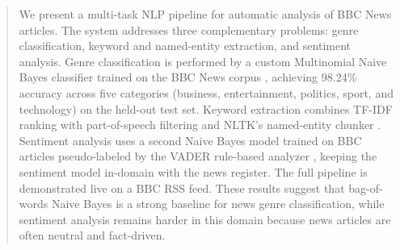 \begin{abstract}
We present a multi-task NLP pipeline for automatic analysis of BBC News articles. The system addresses three complementary problems: genre classification, keyword and named-entity extraction, and sentiment analysis. Genre classification is performed by a custom Multinomial Naive Bayes classifier trained on the BBC News corpus \cite{greene2006practical}, achieving 98.24\% accuracy across five categories (business, entertainment, politics, sport, and technology) on the held-out test set. Keyword extraction combines TF-IDF ranking with part-of-speech filtering and NLTK's named-entity chunker \cite{bird2009natural}. Sentiment analysis uses a second Naive Bayes model trained on BBC articles pseudo-labeled by the VADER rule-based analyzer \cite{hutto2014vader}, keeping the sentiment model in-domain with the news register. The full pipeline is demonstrated live on a BBC RSS feed. These results suggest that bag-of-words Naive Bayes is a strong baseline for news genre classification, while sentiment analysis remains harder in this domain because news articles are often neutral and fact-driven.
\end{abstract}
